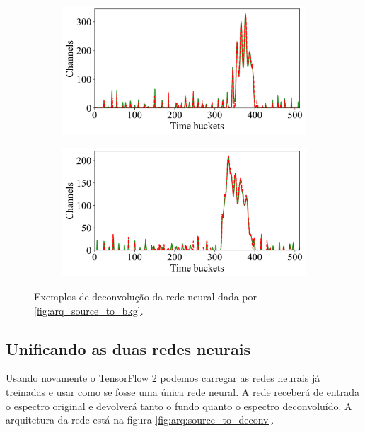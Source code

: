 \documentclass[a4paper,12pt,oneside]{book}
\begin{document}
\begin{figure}[H]
\begin{subfigure}[b]{0.465\textwidth}
        \caption{}
        \label{subfig:std_ex2}
    \end{subfigure}
    \begin{subfigure}[b]{0.49\textwidth}
        \centering
        \includegraphics[scale=0.425]{figs/swbtd_3.png}
        \caption{}
        \label{subfig:std_ex3}
    \end{subfigure}%
    \hfill
    \begin{subfigure}[b]{0.465\textwidth}
        \centering
        \includegraphics[scale=0.425]{figs/swbtd_4.png}
        \caption{}
        \label{subfig:std_ex4}
    \end{subfigure}
\caption{Exemplos de deconvolução da rede neural dada por \ref{fig:arq_source_to_bkg}.}
\label{fig:std_examples}
\end{figure}


\subsection{Unificando as duas redes neurais}

\par Usando novamente o TensorFlow 2 podemos carregar as redes neurais já treinadas e usar como se fosse uma única rede neural. A rede receberá de entrada o espectro original e devolverá tanto o fundo quanto o espectro deconvoluído. A arquitetura da rede está na figura \ref{fig:arq:source_to_deconv}.
\end{document}
